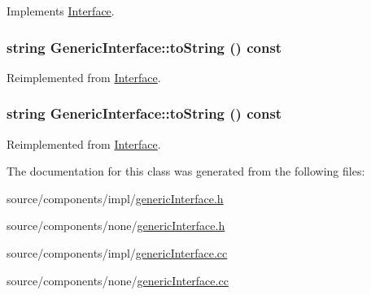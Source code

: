 Implements \hyperlink{classInterface_f9015204e6dabe3e0fce572b19cd1550}{Interface}.\hypertarget{classGenericInterface_ae1400fce0c7ba48965596ec172e474b}{
\subsubsection[{toString}]{\setlength{\rightskip}{0pt plus 5cm}string GenericInterface::toString () const}}
\label{classGenericInterface_ae1400fce0c7ba48965596ec172e474b}




Reimplemented from \hyperlink{classInterface_137cdb3bca46eb2ae0bbf017d1efb66e}{Interface}.\hypertarget{classGenericInterface_ae1400fce0c7ba48965596ec172e474b}{
\subsubsection[{toString}]{\setlength{\rightskip}{0pt plus 5cm}string GenericInterface::toString () const}}
\label{classGenericInterface_ae1400fce0c7ba48965596ec172e474b}




Reimplemented from \hyperlink{classInterface_137cdb3bca46eb2ae0bbf017d1efb66e}{Interface}.

The documentation for this class was generated from the following files:\begin{CompactItemize}
\item 
source/components/impl/\hyperlink{impl_2genericInterface_8h}{genericInterface.h}\item 
source/components/none/\hyperlink{none_2genericInterface_8h}{genericInterface.h}\item 
source/components/impl/\hyperlink{impl_2genericInterface_8cc}{genericInterface.cc}\item 
source/components/none/\hyperlink{none_2genericInterface_8cc}{genericInterface.cc}\end{CompactItemize}
